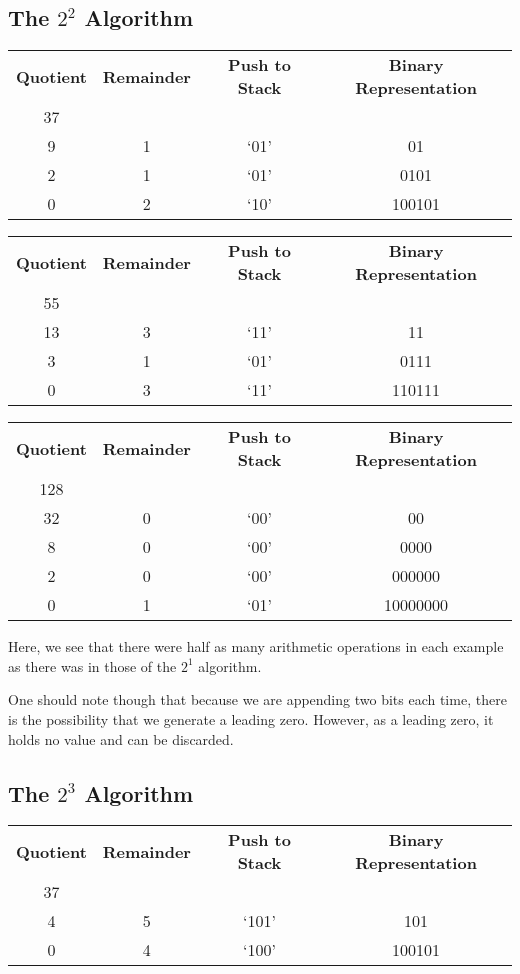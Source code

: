 \documentclass[12pt]{article}
\begin{document}
\subsection{The $2^2$ Algorithm}
\begin{center}
  \begin{tabular}{c|c|c|c}
    \textbf{Quotient} & \textbf{Remainder} & \textbf{Push to Stack} & \textbf{Binary Representation} \\
    37 &   &      & \\
    9  & 1 & `01' & 01 \\
    2  & 1 & `01' & 0101 \\
    0  & 2 & `10' & 100101
  \end{tabular}
\end{center}

\begin{center}
  \begin{tabular}{c|c|c|c}
    \textbf{Quotient} & \textbf{Remainder} & \textbf{Push to Stack} & \textbf{Binary Representation} \\
    55 &   &      & \\
    13 & 3 & `11' & 11 \\
    3  & 1 & `01' & 0111 \\
    0  & 3 & `11' & 110111
  \end{tabular}
\end{center}

\begin{center}
  \begin{tabular}{c|c|c|c}
    \textbf{Quotient} & \textbf{Remainder} & \textbf{Push to Stack} & \textbf{Binary Representation} \\
    128 &   &      & \\
    32  & 0 & `00' & 00 \\
    8   & 0 & `00' & 0000 \\
    2   & 0 & `00' & 000000 \\
    0   & 1 & `01' & 10000000
  \end{tabular}
\end{center}
Here, we see that there were half as many arithmetic operations in each example as there was in those of the $2^1$ algorithm.
\par One should note though that because we are appending two bits each time, there is the possibility that we generate a leading zero. However, as a leading zero, it holds no value and can be discarded.

\subsection{The $2^3$ Algorithm}
\begin{center}
  \begin{tabular}{c|c|c|c}
    \textbf{Quotient} & \textbf{Remainder} & \textbf{Push to Stack} & \textbf{Binary Representation} \\
    37 &   &       & \\
    4  & 5 & `101' & 101 \\
    0  & 4 & `100' & 100101
  \end{tabular}
\end{center}
\end{document}

